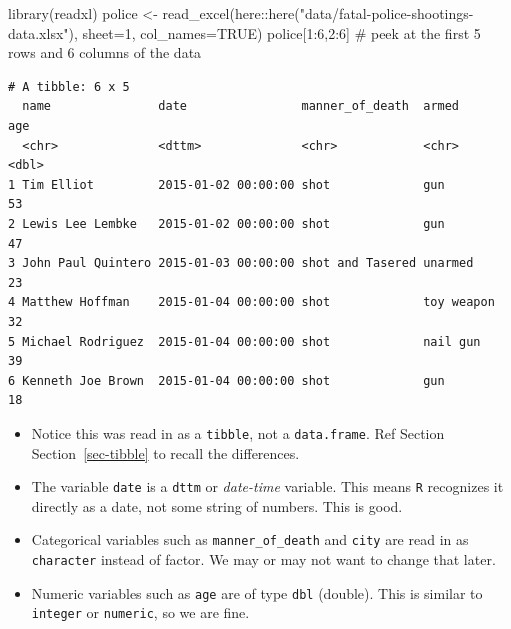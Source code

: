 \documentclass[
  letterpaper,
  DIV=11,
  numbers=noendperiod,
  oneside]{scrreprt}
\newenvironment{Shaded}{\begin{snugshade}}{\end{snugshade}}
\newcommand{\AttributeTok}[1]{\textcolor[rgb]{0.40,0.45,0.13}{#1}}
\newcommand{\CommentTok}[1]{\textcolor[rgb]{0.37,0.37,0.37}{#1}}
\newcommand{\ConstantTok}[1]{\textcolor[rgb]{0.56,0.35,0.01}{#1}}
\newcommand{\DecValTok}[1]{\textcolor[rgb]{0.68,0.00,0.00}{#1}}
\newcommand{\FunctionTok}[1]{\textcolor[rgb]{0.28,0.35,0.67}{#1}}
\newcommand{\NormalTok}[1]{\textcolor[rgb]{0.00,0.23,0.31}{#1}}
\newcommand{\OtherTok}[1]{\textcolor[rgb]{0.00,0.23,0.31}{#1}}
\newcommand{\SpecialCharTok}[1]{\textcolor[rgb]{0.37,0.37,0.37}{#1}}
\newcommand{\StringTok}[1]{\textcolor[rgb]{0.13,0.47,0.30}{#1}}
\providecommand{\tightlist}{%
  \setlength{\itemsep}{0pt}\setlength{\parskip}{0pt}}\usepackage{longtable,booktabs,array}
\begin{document}
\begin{Shaded}
\begin{Highlighting}[]
\FunctionTok{library}\NormalTok{(readxl)}
\NormalTok{police  }\OtherTok{\textless{}{-}} \FunctionTok{read\_excel}\NormalTok{(here}\SpecialCharTok{::}\FunctionTok{here}\NormalTok{(}\StringTok{"data/fatal{-}police{-}shootings{-}data.xlsx"}\NormalTok{), }
                      \AttributeTok{sheet=}\DecValTok{1}\NormalTok{, }\AttributeTok{col\_names=}\ConstantTok{TRUE}\NormalTok{)}
\NormalTok{police[}\DecValTok{1}\SpecialCharTok{:}\DecValTok{6}\NormalTok{,}\DecValTok{2}\SpecialCharTok{:}\DecValTok{6}\NormalTok{] }\CommentTok{\# peek at the first 5 rows and 6 columns of the data}
\end{Highlighting}
\end{Shaded}

\begin{verbatim}
# A tibble: 6 x 5
  name               date                manner_of_death  armed        age
  <chr>              <dttm>              <chr>            <chr>      <dbl>
1 Tim Elliot         2015-01-02 00:00:00 shot             gun           53
2 Lewis Lee Lembke   2015-01-02 00:00:00 shot             gun           47
3 John Paul Quintero 2015-01-03 00:00:00 shot and Tasered unarmed       23
4 Matthew Hoffman    2015-01-04 00:00:00 shot             toy weapon    32
5 Michael Rodriguez  2015-01-04 00:00:00 shot             nail gun      39
6 Kenneth Joe Brown  2015-01-04 00:00:00 shot             gun           18
\end{verbatim}

\begin{itemize}
\tightlist
\item
  Notice this was read in as a \texttt{tibble}, not a
  \texttt{data.frame}. Ref Section Section~\ref{sec-tibble} to recall
  the differences.
\item
  The variable \texttt{date} is a \texttt{dttm} or \emph{date-time}
  variable. This means \texttt{R} recognizes it directly as a date, not
  some string of numbers. This is good.
\item
  Categorical variables such as \texttt{manner\_of\_death} and
  \texttt{city} are read in as \texttt{character} instead of factor. We
  may or may not want to change that later.
\item
  Numeric variables such as \texttt{age} are of type \texttt{dbl}
  (double). This is similar to \texttt{integer} or \texttt{numeric}, so
  we are fine.
\end{itemize}
\end{document}
